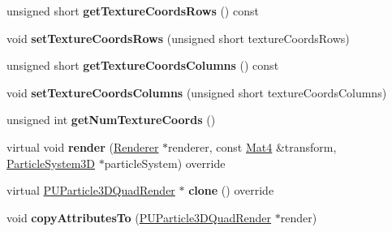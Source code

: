 \begin{DoxyCompactItemize}
\mbox{\label{classPUParticle3DQuadRender_adf4c4a39a1fccf41eb0441fa9cda5ed4}} 
unsigned short {\bfseries get\+Texture\+Coords\+Rows} () const
\item 
\mbox{\label{classPUParticle3DQuadRender_aa2eb54e15359b351b90d25c218da9987}} 
void {\bfseries set\+Texture\+Coords\+Rows} (unsigned short texture\+Coords\+Rows)
\item 
\mbox{\label{classPUParticle3DQuadRender_a6e65fa6108475ac778ddac534068aa23}} 
unsigned short {\bfseries get\+Texture\+Coords\+Columns} () const
\item 
\mbox{\label{classPUParticle3DQuadRender_a98ca73c7ea5a6b02fbbb67de27939bb6}} 
void {\bfseries set\+Texture\+Coords\+Columns} (unsigned short texture\+Coords\+Columns)
\item 
\mbox{\label{classPUParticle3DQuadRender_a456359faf3849ccf88d37e0a77081842}} 
unsigned int {\bfseries get\+Num\+Texture\+Coords} ()
\item 
\mbox{\label{classPUParticle3DQuadRender_aa7191ba8969801bd1013844470196a36}} 
virtual void {\bfseries render} (\hyperlink{classRenderer}{Renderer} $\ast$renderer, const \hyperlink{classMat4}{Mat4} \&transform, \hyperlink{classParticleSystem3D}{Particle\+System3D} $\ast$particle\+System) override
\item 
\mbox{\label{classPUParticle3DQuadRender_a6e6d905b87d640fbbbb456d8397e5799}} 
virtual \hyperlink{classPUParticle3DQuadRender}{P\+U\+Particle3\+D\+Quad\+Render} $\ast$ {\bfseries clone} () override
\item 
\mbox{\label{classPUParticle3DQuadRender_a0554469267ed4b534c4718b6be8d1abb}} 
void {\bfseries copy\+Attributes\+To} (\hyperlink{classPUParticle3DQuadRender}{P\+U\+Particle3\+D\+Quad\+Render} $\ast$render)
\end{DoxyCompactItemize}
